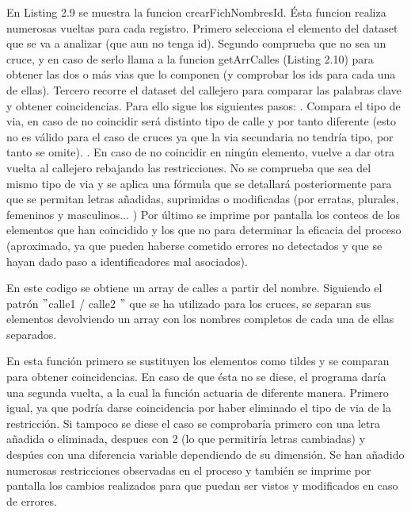 \begin{itemize}
En Listing 2.9 se muestra la funcion crearFichNombresId. Ésta funcion realiza numerosas vueltas para cada registro. Primero selecciona el elemento del dataset que se va a analizar (que aun no tenga id). Segundo comprueba que no sea un cruce, y en caso de serlo llama a la funcion getArrCalles (Listing 2.10) para obtener las dos o más vias que lo componen (y comprobar los ids para cada una de ellas). Tercero recorre el dataset del callejero para comparar las palabras clave y obtener coincidencias. Para ello sigue los siguientes pasos:
. Compara el tipo de via, en caso de no coincidir será distinto tipo de calle y por tanto diferente (esto no es válido para el caso de cruces ya que la via secundaria no tendría tipo, por tanto se omite).
. En caso de no coincidir en ningún elemento, vuelve a dar otra vuelta al callejero rebajando las restricciones. No se comprueba que sea del mismo tipo de via y se aplica una fórmula que se detallará posteriormente para que se permitan letras añadidas, suprimidas o modificadas (por erratas, plurales, femeninos y masculinos... )
\newline
Por último se imprime por pantalla los conteos de los elementos que han coincidido y los que no para determinar la eficacia del proceso (aproximado, ya que pueden haberse cometido errores no detectados y que se hayan dado paso a identificadores mal asociados).
\newline

    
	   

En este codigo se obtiene un array de calles a partir del nombre. Siguiendo el patrón  $"$calle1 / calle2 $"$ que se ha utilizado para los cruces, se separan sus elementos devolviendo un array con los nombres completos de cada una de ellas separados.
\newline




    
    
En esta función primero se sustituyen los elementos como tildes y se comparan para obtener coincidencias.
\newline
En caso de que ésta no se diese, el programa daría una segunda vuelta, a la cual la función actuaria de diferente manera. Primero igual, ya que podría darse coincidencia por haber eliminado el tipo de via de la restricción. Si tampoco se diese el caso se comprobaría primero con una letra añadida o eliminada, despues con 2 (lo que permitiría letras cambiadas) y despúes con una diferencia variable dependiendo de su dimensión.
\newline
Se han añadido numerosas restricciones observadas en el proceso y también se imprime por pantalla los cambios realizados para que puedan ser vistos y modificados en caso de errores.


\end{itemize}

